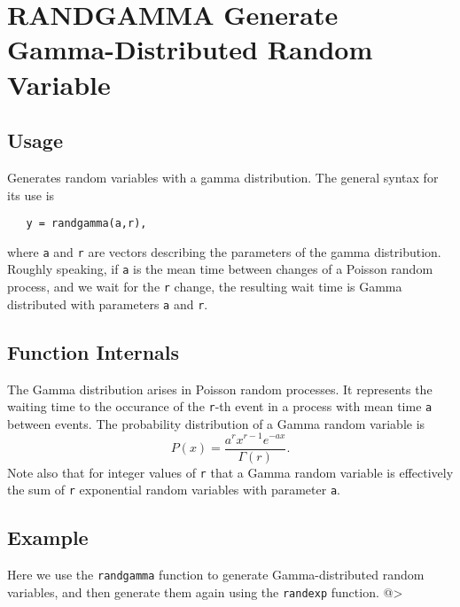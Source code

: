 \section{RANDGAMMA Generate Gamma-Distributed Random Variable}

\subsection{Usage}

Generates random variables with a gamma distribution.  The general
syntax for its use is
\begin{verbatim}
   y = randgamma(a,r),
\end{verbatim}
where \verb|a| and \verb|r| are vectors describing the parameters of the
gamma distribution.  Roughly speaking, if \verb|a| is the mean time between
changes of a Poisson random process, and we wait for the \verb|r| change,
the resulting wait time is Gamma distributed with parameters \verb|a| 
and \verb|r|.
\subsection{Function Internals}

The Gamma distribution arises in Poisson random processes.  It represents
the waiting time to the occurance of the \verb|r|-th event in a process with
mean time \verb|a| between events.  The probability distribution of a Gamma
random variable is
\[
   P(x) = \frac{a^r x^{r-1} e^{-ax}}{\Gamma(r)}.
\]
Note also that for integer values of \verb|r| that a Gamma random variable
is effectively the sum of \verb|r| exponential random variables with parameter
\verb|a|.
\subsection{Example}

Here we use the \verb|randgamma| function to generate Gamma-distributed
random variables, and then generate them again using the \verb|randexp|
function.
@>

